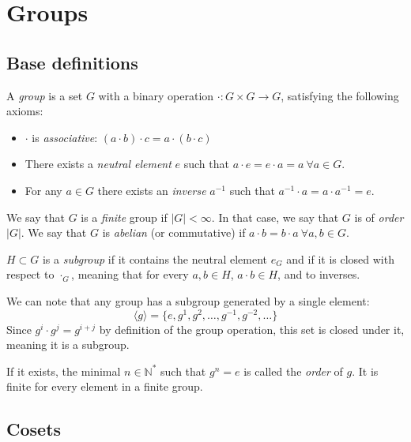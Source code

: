 \chapter{Groups}

\section{Base definitions}

\begin{definition}
  A \emph{group} is a set $G$ with a binary operation $\cdot: G \times G \to G$, satisfying the following axioms: 
  \begin{itemize}
    \item $\cdot$ is \emph{associative}: $(a \cdot b) \cdot c = a \cdot (b \cdot c)$
    \item There exists a \emph{neutral element} $e$ such that $a \cdot e = e \cdot a = a \ \forall a \in G$. 
    \item For any $a \in G$ there exists an \emph{inverse} $a^{-1}$ such that $a^{-1} \cdot a = a \cdot a^{-1} = e$. 
  \end{itemize}
  We say that $G$ is a \emph{finite} group if $|G| < \infty$. In that case, we say that $G$ is of \emph{order} $|G|$. 
  We say that $G$ is \emph{abelian} (or commutative) if $a\cdot b = b\cdot a \ \forall a, b \in G$. 
\end{definition}
\begin{definition}
  $H \subset G$ is a \emph{subgroup} if it contains the neutral element $e_G$ and if it is closed with respect to $\cdot_G$, meaning that for every $a, b \in H$, $a\cdot b \in H$, and to inverses. 
\end{definition}

We can note that any group has a subgroup generated by a single element:
\[
  \langle g \rangle = \{e, g^{1}, g^{2}, \dots, g^{-1}, g^{-2}, \dots\}
\]
Since $g^i \cdot g^j = g^{i + j}$ by definition of the group operation, this set is closed under it, meaning it is a subgroup. 

\begin{definition}
  If it exists, the minimal $n \in \mathbb{N}^*$ such that $g^n = e$ is called the \emph{order} of $g$. It is finite for every element in a finite group. 
\end{definition}

\section{Cosets}

